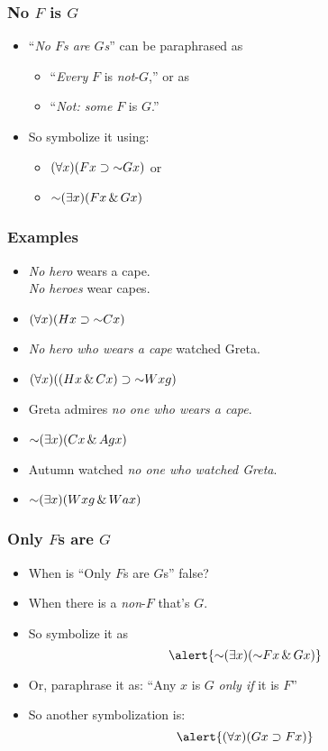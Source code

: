 \begin{frame}
\frametitle{No $F$ is $G$}

\begin{itemize}[<+->]
  \item ``\emph{No $F$s are $G$s}'' can be paraphrased as 
\begin{itemize}[<+->]
  \item ``\emph{Every} $F$ is \emph{not}-$G$,'' or as
  \item ``\emph{Not: some} $F$ is $G$.''
  \end{itemize}
  \item So symbolize it using:
\begin{itemize}
  \item \emph{$\qt{\forall}{x}(F\qv{x} \to \enot G\qv{x})$} or
  \item \emph{$\enot\qt{\exists}{x}(F\qv{x} \eand G\qv{x})$}
\end{itemize}
\end{itemize}

\end{frame}

\begin{frame}
\frametitle{Examples}

\begin{itemize}[<+->]
  \item \emph{No hero} wears a cape.\\
  \emph{No heroes} wear capes.\\
  \item[] \alert{$\qt{\forall}{x}(H\qv{x} \eif \enot C\qv{x})$}
  \item \emph{No hero who wears a cape} watched Greta.\\
  \item[] \alert{$\qt{\forall}{x}((H\qv{x} \eand C\qv{x}) \eif \enot W\qr{x}{g})$}
  \item Greta admires \emph{no one who wears a cape}.
  \item[] \alert{$\enot\qt{\exists}{x}(C\qv{x} \eand A\qr{g}{x})$}
  \item Autumn watched \emph{no one who watched Greta}.
  \item[] \alert{$\enot\qt{\exists}{x}(W\qr{x}{g} \eand W\qr{a}{x})$}
\end{itemize}
\end{frame}


\begin{frame}
\frametitle{Only $F$s are $G$}

\begin{itemize}[<+->]
\item When is ``Only $F$s are $G$s'' false?
\item When there is a \emph{non}-$F$ that's $G$.
\item So symbolize it as
\[
  \alert{\enot\qt{\exists}{x}(\enot F\qv{x} \eand G\qv{x})}
  \]
\item Or, paraphrase it as: ``Any $x$ is $G$ \emph{only if} it is $F$''
\item So another symbolization is:
\[
  \alert{\qt{\forall}{x}(G\qv{x} \to F\qv{x})}
\]
\end{itemize}
\end{frame}

